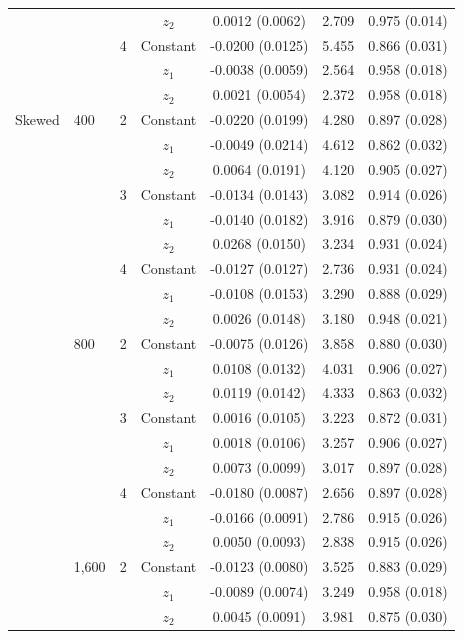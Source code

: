 \begin{tabular}{llccccc}
 &  &  & $z_2$ & 0.0012 (0.0062) & 2.709 & 0.975 (0.014) \\
\addlinespace
 &  & 4 & Constant & -0.0200 (0.0125) & 5.455 & 0.866 (0.031) \\
 &  &  & $z_1$ & -0.0038 (0.0059) & 2.564 & 0.958 (0.018) \\
 &  &  & $z_2$ & 0.0021 (0.0054) & 2.372 & 0.958 (0.018) \\
\addlinespace
Skewed & 400 & 2 & Constant & -0.0220 (0.0199) & 4.280 & 0.897 (0.028) \\
 &  &  & $z_1$ & -0.0049 (0.0214) & 4.612 & 0.862 (0.032) \\
 &  &  & $z_2$ & 0.0064 (0.0191) & 4.120 & 0.905 (0.027) \\
\addlinespace
 &  & 3 & Constant & -0.0134 (0.0143) & 3.082 & 0.914 (0.026) \\
 &  &  & $z_1$ & -0.0140 (0.0182) & 3.916 & 0.879 (0.030) \\
 &  &  & $z_2$ & 0.0268 (0.0150) & 3.234 & 0.931 (0.024) \\
\addlinespace
 &  & 4 & Constant & -0.0127 (0.0127) & 2.736 & 0.931 (0.024) \\
 &  &  & $z_1$ & -0.0108 (0.0153) & 3.290 & 0.888 (0.029) \\
 &  &  & $z_2$ & 0.0026 (0.0148) & 3.180 & 0.948 (0.021) \\
\addlinespace
 & 800 & 2 & Constant & -0.0075 (0.0126) & 3.858 & 0.880 (0.030) \\
 &  &  & $z_1$ & 0.0108 (0.0132) & 4.031 & 0.906 (0.027) \\
 &  &  & $z_2$ & 0.0119 (0.0142) & 4.333 & 0.863 (0.032) \\
\addlinespace
 &  & 3 & Constant & 0.0016 (0.0105) & 3.223 & 0.872 (0.031) \\
 &  &  & $z_1$ & 0.0018 (0.0106) & 3.257 & 0.906 (0.027) \\
 &  &  & $z_2$ & 0.0073 (0.0099) & 3.017 & 0.897 (0.028) \\
\addlinespace
 &  & 4 & Constant & -0.0180 (0.0087) & 2.656 & 0.897 (0.028) \\
 &  &  & $z_1$ & -0.0166 (0.0091) & 2.786 & 0.915 (0.026) \\
 &  &  & $z_2$ & 0.0050 (0.0093) & 2.838 & 0.915 (0.026) \\
\addlinespace
 & 1,600 & 2 & Constant & -0.0123 (0.0080) & 3.525 & 0.883 (0.029) \\
 &  &  & $z_1$ & -0.0089 (0.0074) & 3.249 & 0.958 (0.018) \\
 &  &  & $z_2$ & 0.0045 (0.0091) & 3.981 & 0.875 (0.030) \\

\end{tabular}
